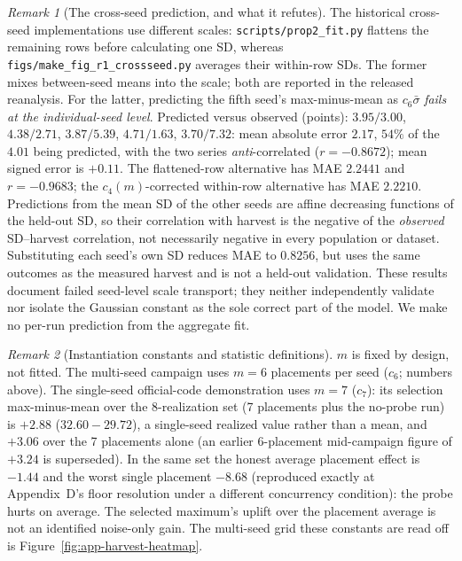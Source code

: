 \documentclass[10pt,letterpaper]{article}
\theoremstyle{remark}
\newtheorem*{remarkx}{Remark}
\newcommand{\code}[1]{\texttt{#1}}
\begin{document}
\begin{remarkx}[The cross-seed prediction, and what it refutes]
The historical cross-seed implementations use different scales:
\code{scripts/prop2\_fit.py} flattens the remaining rows before calculating one SD,
whereas \code{figs/make\_fig\_r1\_crossseed.py} averages their within-row SDs.
The former mixes between-seed means into the scale; both are reported in
the released reanalysis. For the latter, predicting the fifth seed's
max-minus-mean as $c_6\bar\sigma$ \emph{fails at the individual-seed level}.
Predicted versus observed
(points): $3.95/3.00$, $4.38/2.71$, $3.87/5.39$, $4.71/1.63$, $3.70/7.32$:
mean absolute error $2.17$, $54\%$ of the $4.01$ being predicted, with the two
series \emph{anti}-correlated ($r=-0.8672$); mean signed error is $+0.11$.
The flattened-row alternative has MAE $2.2441$ and $r=-0.9683$; the
$c_4(m)$-corrected within-row alternative has MAE $2.2210$.
Predictions from the mean SD of the other seeds are affine decreasing
functions of the held-out SD,
so their correlation with harvest is the negative of the \emph{observed}
SD--harvest correlation, not necessarily negative in every population or
dataset. Substituting each seed's own SD reduces MAE to $0.8256$, but uses
the same outcomes as the measured harvest and is not a held-out validation.
These results document failed seed-level scale transport; they neither
independently validate nor isolate the Gaussian constant as the sole correct
part of the model. We make no per-run prediction from the aggregate fit.
\end{remarkx}


\begin{remarkx}[Instantiation constants and statistic definitions]
$m$ is fixed by design, not fitted. The multi-seed campaign uses $m = 6$
placements per seed ($c_6$; numbers above). The single-seed official-code
demonstration uses $m = 7$ ($c_7$): its selection max-minus-mean over the
8-realization set (7 placements plus the no-probe run) is $+2.88$
($32.60 - 29.72$), a single-seed realized value rather than a mean, and
$+3.06$ over the 7 placements alone (an earlier 6-placement mid-campaign
figure of $+3.24$ is superseded). In the same set the honest average
placement effect is $-1.44$ and the worst single placement $-8.68$
(reproduced exactly at Appendix~D's floor resolution under a different
concurrency condition): the probe hurts on average. The selected maximum's
uplift over the placement average is not an identified noise-only gain.
The multi-seed grid these
constants are read off is Figure~\ref{fig:app-harvest-heatmap}.
\end{remarkx}
\end{document}
